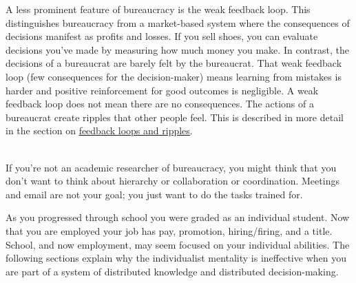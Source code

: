 A less prominent feature of bureaucracy is the weak 
\gls{feedback loop}. 
\iftoggle{glossaryinmargin}{\marginpar{[Glossary]}}{} This distinguishes bureaucracy from a market-based system where the consequences of decisions manifest as profits and losses. If you sell shoes, you can evaluate decisions you've made by measuring how much money you make. In contrast, the decisions of a bureaucrat are barely felt by the bureaucrat. That weak feedback loop (few consequences for the decision-maker) means learning from mistakes is harder and positive reinforcement for good outcomes is negligible. A weak feedback loop does not mean there are no consequences. The actions of a bureaucrat create ripples that other people feel. This is described in more detail in the section on \hyperref[sec:feedback-loop-and-ripples]{feedback loops and ripples}.

\ \\

If you're not an academic researcher of bureaucracy, you might think that you don't want to think about hierarchy or collaboration or coordination. Meetings and email are not your goal; you just want to do the tasks trained for. 

As you progressed through school you were graded as an individual student. Now that you are employed your job has pay, promotion, hiring/firing, and a title. School, and now employment, may seem focused on your individual abilities. The following sections explain why the individualist mentality is ineffective when you are part of a system of distributed knowledge and distributed decision-making. 


